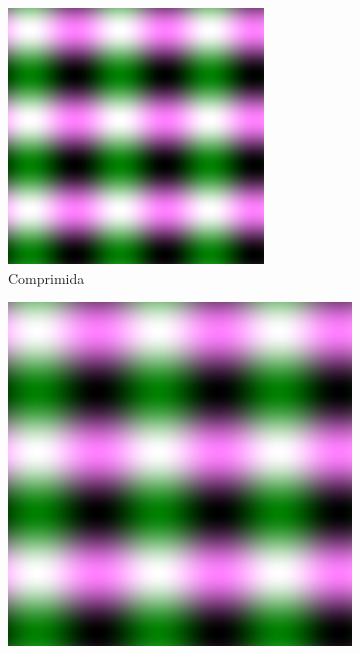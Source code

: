 \documentclass{article}
\begin{document}
\begin{figure}[ht]
\begin{subfigure}{0.23\textwidth}
    \includegraphics[width=\textwidth]{senoidal/h-10/compressed.png}
    \caption{Comprimida}
  \end{subfigure}%
  \hfill
  \begin{subfigure}{0.23\textwidth}
    \centering
    \includegraphics[width=\textwidth]{senoidal/h-10/decompressed-bilinear.png}

\end{subfigure}
\end{figure}
\end{document}
